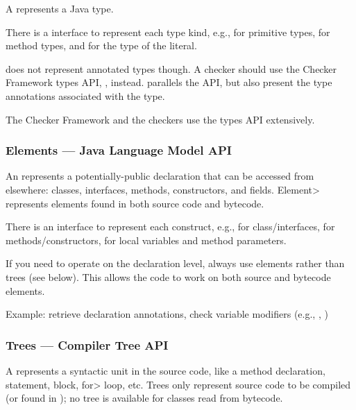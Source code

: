 A  represents a Java type.

\begin{sloppypar}
There is a  interface to represent each type kind,
e.g.,  for primitive types, 
for method types, and  for the type of the  literal.
\end{sloppypar}

 does not represent annotated types though.  A checker
should use the Checker Framework types API,
, instead.  
parallels the  API, but also present the type annotations
associated with the type.

The Checker Framework and the checkers use the types API extensively.


\subsubsection{Elements --- Java Language Model API\label{creating-javac-elements}}

An  represents a potentially-public
declaration that can be accessed from elsewhere:  classes, interfaces, methods, constructors, and
fields.  \<Element> represents elements found in both source
code and bytecode.

There is an  interface to represent each construct, e.g.,
 for class/interfaces,  for
methods/constructors,  for local variables and
method parameters.

If you need to operate on the declaration level, always use elements rather
than trees
(see below).  This allows the code to work on
both source and bytecode elements.

Example: retrieve declaration annotations, check variable
modifiers (e.g., , )


\subsubsection{Trees --- Compiler Tree API\label{creating-javac-trees}}

A  represents a syntactic unit in the source code,
like a method declaration, statement, block, \<for> loop, etc. Trees only
represent source code to be compiled (or found in );
no tree is available for classes read from bytecode.


